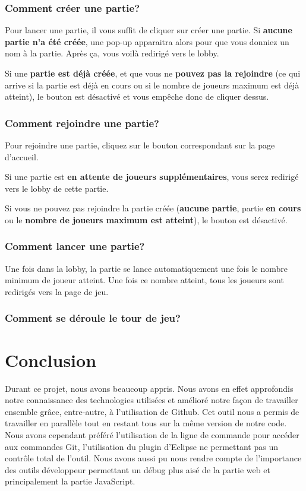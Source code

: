 \documentclass[11pt]{scrreprt}
\begin{document}
    \subsection{Comment créer une partie?}
    Pour lancer une partie, il vous suffit de cliquer sur créer une partie.
    Si \textbf{aucune partie n'a été créée}, une pop-up apparaitra alors pour que vous donniez un nom à la partie. Après ça, vous voilà redirigé vers le lobby.

    Si une \textbf{partie est déjà créée}, et que vous ne \textbf{pouvez pas la rejoindre} (ce qui arrive si la partie est déjà en cours ou si le nombre de joueurs maximum est déjà atteint), le bouton est désactivé et vous empêche donc de cliquer dessus.

    \subsection{Comment rejoindre une partie?}
    Pour rejoindre une partie, cliquez sur le bouton correspondant sur la page d'accueil.

    Si une partie est \textbf{en attente de joueurs supplémentaires}, vous serez redirigé vers le lobby de cette partie.

    Si vous ne pouvez pas rejoindre la partie créée (\textbf{aucune partie}, partie \textbf{en cours} ou le \textbf{nombre de joueurs maximum est atteint}), le bouton est désactivé.

    \subsection{Comment lancer une partie?}
    Une fois dans la lobby, la partie se lance automatiquement une fois le nombre minimum de joueur atteint. Une fois ce nombre atteint, tous les joueurs sont redirigés vers la page de jeu.

    \subsection{Comment se déroule le tour de jeu?}

    \chapter{Conclusion}
    Durant ce projet, nous avons beaucoup appris. Nous avons en effet approfondis notre connaissance des technologies utilisées et amélioré notre façon de travailler ensemble grâce, entre-autre, à l'utilisation de Github. Cet outil nous a permis de travailler en parallèle tout en restant tous sur la même version de notre code. Nous avons cependant préféré l'utilisation de la ligne de commande pour accéder aux commandes Git, l'utilisation du plugin d'Eclipse ne permettant pas un contrôle total de l'outil. Nous avons aussi pu nous rendre compte de l'importance des \og outils développeur\fg{} permettant un débug plus aisé de la partie web et principalement la partie JavaScript.
\end{document}
